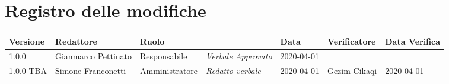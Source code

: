 \section*{Registro delle modifiche}
\renewcommand{\arraystretch}{1.8}

  \setlength\LTleft{-1.7cm}
  \begin{longtable}{|p{1.7cm}|p{2cm}|p{2.5cm}|p{3cm}|p{1.7cm}|p{2cm}|p{2.3cm}|}
    \hline

    \rowcolor{header}
    \textbf{Versione} & \textbf{Redattore} & \textbf{Ruolo} & \centering{\textbf{Descrizione}} & \textbf{Data} & \textbf{Verificatore} & \textbf{Data Verifica}\\

    \hline
    1.0.0 & Gianmarco Pettinato & Responsabile & \small{\textit{Verbale Approvato}} & 2020-04-01 & &\\
	  1.0.0-TBA & Simone Franconetti & Amministratore & \small{\textit{Redatto verbale}} & 2020-04-01 & Gezim Cikaqi & 2020-04-01 \\
    \hline
  \end{longtable}
  \setlength\LTleft{0cm}
